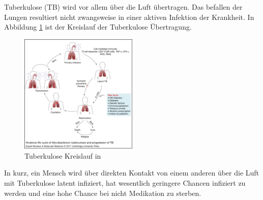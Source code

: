 \documentclass[paper=a4, fontsize=11pt, ngerman, abstract=on]{scrartcl}
\numberwithin{equation}{section} %
\numberwithin{figure}{section} %
\numberwithin{table}{section} %
\begin{document}
Tuberkulose (TB) wird vor allem über die Luft übertragen. Das befallen der Lungen resultiert nicht zwangsweise in einer aktiven Infektion der Krankheit. In Abbildung \ref{fig:tuberculosis-cycle} ist der Kreislauf der Tuberkulose Übertragung.

\begin{figure}[ht]
  \centering
  \includegraphics[width=0.5\textwidth,keepaspectratio]{images/tuberculosis-cycle}
  \caption{Tuberkulose Kreislauf in \cite{Kumar2011}}
  \label{fig:tuberculosis-cycle}
\end{figure}

In kurz, ein Mensch wird über direkten Kontakt von einem anderen über die Luft mit Tuberkulose latent infiziert, hat wesentlich geringere Chancen infiziert zu werden und eine hohe Chance bei nicht Medikation zu sterben.
\end{document}
